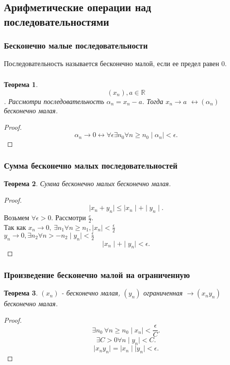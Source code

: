 \documentclass[a4paper]{article}
\newtheorem{theorem}{Теорема}
\begin{document}
\subsection{Арифметические операции над последовательностями}
\subsubsection{Бесконечно малые последовательности}
Последовательность называется бесконечно малой, если ее предел равен 0.
\subsubsection{}
\begin{theorem}
	$$(x_n) , a \in \mathbb{R}$$. Рассмотри последовательность $\alpha_n = x_n - a$. Тогда $x_n \to a$
	$\leftrightarrow (\alpha_n)$ бесконечно малая.
\end{theorem}
\begin{proof}
	\[
		\alpha_n \to 0 \leftrightarrow \forall  \epsilon \exists  n_0 \forall n \ge  n_0 \mid \alpha_n \mid <\epsilon
		.\]
\end{proof}
\subsubsection{Сумма бесконечно малых последовательностей}
\begin{theorem}
	Сумма бесконечно малых бесконечно малая.
\end{theorem}
\begin{proof}
	\[
		\mid x_n + y_n \mid \le \mid x_n \mid + \mid y_n \mid
		.\]
	Возьмем $\forall \epsilon > 0$. Рассмотри $\frac{e}{2}$.\\ Так как $x_n \to 0, ~ \exists n_1 \forall n
		\ge n_1 , \mid x_n \mid < \frac{\epsilon}{2}~$ \\
	$y_n \to 0 , \exists  n_2 \forall  n >- n_2 \mid y_n \mid < \frac{\epsilon}{2}$
	\[
		\mid x_n \mid + \mid y_n \mid < \epsilon
		.\]
\end{proof}
\subsubsection{Произведение бесконечно малой на ограниченную}
\begin{theorem}
	$(x_n)$ - бесконечно малая, $(y_n)$ ограниченная   $\rightarrow (x_{n}y_{n})$ бесконечно малая.
\end{theorem}
\begin{proof}
	\[
		\exists n_0 ~ \forall n \ge n_0 \mid x_n \mid < \frac{\epsilon}{C}
		.\]
	\[
		\exists C > 0 \forall n \mid y_n \mid < C
		.\]
	\[
		\mid x_n y_n \mid = \mid x_n \mid \mid y_n \mid < \epsilon
		.\]
\end{proof}
\end{document}
